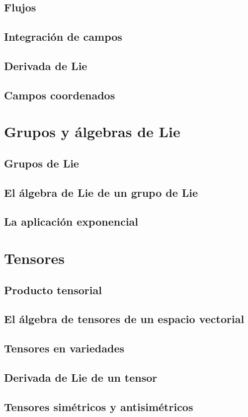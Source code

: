 \documentclass[12pt,a4paper]{book}
\theoremstyle{definition} \newtheorem{defn}[thm]{Definición}
\theoremstyle{definition} \newtheorem{ejemplo}[thm]{Ejemplo}
\theoremstyle{definition} \newtheorem{ejercicio}[thm]{Ejercicio}
\theoremstyle{remark} \newtheorem*{obs}{Observación}
\begin{document}
	  \section{Flujos}
	  \section{Integración de campos}
	  \section{Derivada de Lie}
	  \section{Campos coordenados}
	  \chapter{Grupos y álgebras de Lie}
	  \section{Grupos de Lie}
	  \section{El álgebra de Lie de un grupo de Lie}
	  \section{La aplicación exponencial}
	  \chapter{Tensores}
	  \section{Producto tensorial}
	  \section{El álgebra de tensores de un espacio vectorial}
	  \section{Tensores en variedades}
	  \section{Derivada de Lie de un tensor}
	  \section{Tensores simétricos y antisimétricos}
\end{document}
